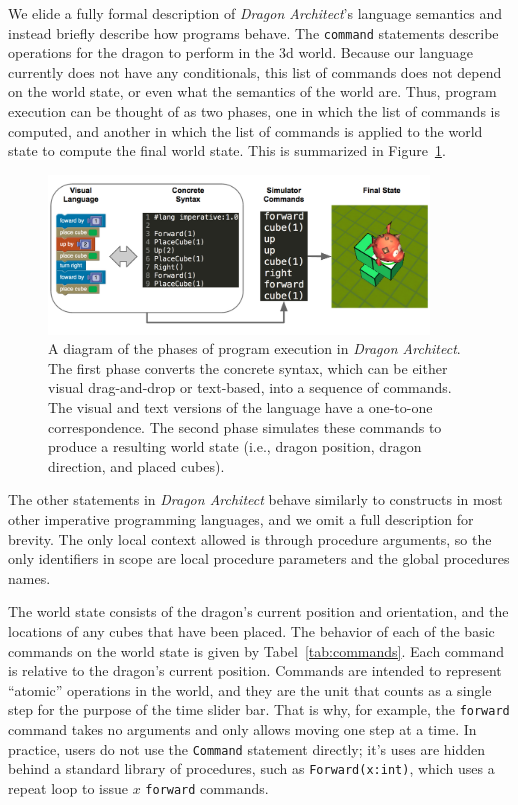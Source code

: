 \documentclass{sig-alternate}
\newcommand{\da}{\emph{Dragon Architect}}
\begin{document}
We elide a fully formal description of \da's language semantics and instead briefly describe how programs behave. The \texttt{command} statements describe operations for the dragon to perform in the 3d world. Because our language currently does not have any conditionals, this list of commands does not depend on the world state, or even what the semantics of the world are. Thus, program execution can be thought of as two phases, one in which the list of commands is computed, and another in which the list of commands is applied to the world state to compute the final world state. This is summarized in Figure~\ref{fig:phases}.

\begin{figure}[ht!]
  \centering
  \includegraphics[width=0.9\textwidth]{images/phases}
  \caption{A diagram of the phases of program execution in \da{}. The first phase converts the concrete syntax, which can be either visual drag-and-drop or text-based, into a sequence of commands. The visual and text versions of the language have a one-to-one correspondence. The second phase simulates these commands to produce a resulting world state (i.e., dragon position, dragon direction, and placed cubes).}
  \label{fig:phases}
\end{figure}

The other statements in \da{} behave similarly to constructs in most other imperative programming languages, and we omit a full description for brevity. The only local context allowed is through procedure arguments, so the only identifiers in scope are local procedure parameters and the global procedures names.

The world state consists of the dragon's current position and orientation, and the locations of any cubes that have been placed.  The behavior of each of the basic commands on the world state is given by Tabel~\ref{tab:commands}. Each command is relative to the dragon's current position. Commands are intended to represent ``atomic'' operations in the world, and they are the unit that counts as a single step for the purpose of the time slider bar. That is why, for example, the \texttt{forward} command takes no arguments and only allows moving one step at a time. In practice, users do not use the \texttt{Command} statement directly; it's uses are hidden behind a standard library of procedures, such as \texttt{Forward(x:int)}, which uses a repeat loop to issue $x$ \texttt{forward} commands.
\end{document}
